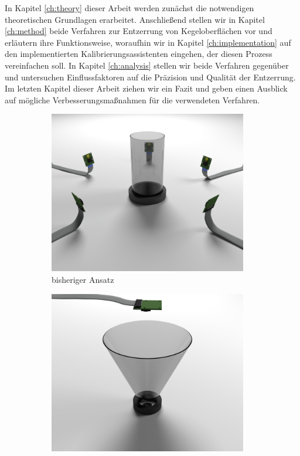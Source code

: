 In Kapitel \ref{ch:theory} dieser Arbeit werden zunächst die notwendigen theoretischen Grundlagen erarbeitet. 
Anschließend stellen wir in Kapitel \ref{ch:method} beide Verfahren zur Entzerrung von Kegeloberflächen vor und erläutern ihre Funktionsweise, woraufhin wir in Kapitel \ref{ch:implementation} auf den implementierten Kalibrierungsassistenten eingehen, der diesen Prozess vereinfachen soll. 
In Kapitel \ref{ch:analysis} stellen wir beide Verfahren gegenüber und untersuchen Einflussfaktoren auf die Präzision und Qualität der Entzerrung. 
Im letzten Kapitel dieser Arbeit ziehen wir ein Fazit und geben einen Ausblick auf mögliche Verbesserungsmaßnahmen für die verwendeten Verfahren.  



\begin{figure}[!htb]
	\centering
	\begin{subfigure}{.5\textwidth}
		\centering
		\includegraphics[width=0.95\textwidth]{images/renderCylinder.png}
		\caption{bisheriger Ansatz}
		\label{fig:oldSetup}
	\end{subfigure}%
	\begin{subfigure}{.5\textwidth}
		\centering
		\includegraphics[width=0.95\textwidth]{images/renderCone.png}

\end{subfigure}
\end{figure}
